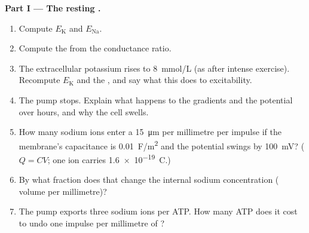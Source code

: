 \begin{problem}
\medskip
\noindent\textbf{Part I --- The resting .}
\begin{enumerate}
  \item Compute $E_{\mathrm K}$ and $E_{\mathrm{Na}}$.
  \item Compute the  from the conductance ratio.
  \item The extracellular potassium rises to \qty{8}{mmol/L} (as
        after intense exercise). Recompute $E_{\mathrm K}$ and the
        , and say what this does to excitability.
  \item The pump stops. Explain what happens to the gradients and the
        potential over hours, and why the cell swells.
  \item How many sodium ions enter a \qty{15}{\micro m}  per
        millimetre per impulse if the membrane's capacitance is
        \qty{0.01}{F/m^2} and the potential swings by \qty{100}{mV}?
        ($Q = CV$; one ion carries \qty{1.6e-19}{C}.)
  \item By what fraction does that change the internal sodium
        concentration ( volume per millimetre)?
  \item The pump exports three sodium ions per ATP. How many ATP
        does it cost to undo one impulse per millimetre of ?
\end{enumerate}


\end{problem}
